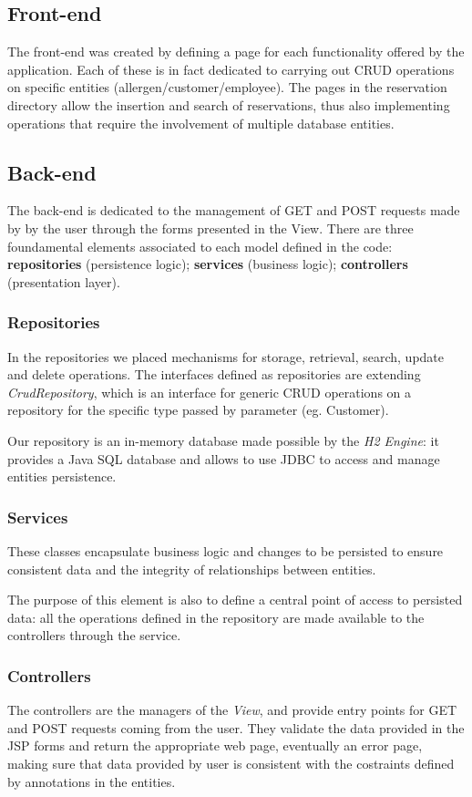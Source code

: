 \documentclass{article}
\begin{document}
\begin{multicols}{2}
\subsection*{Front-end}
The front-end was created by defining a page for each functionality offered by the application. Each of these is in fact dedicated to carrying out CRUD operations on specific entities (allergen/customer/employee). The pages in the reservation directory allow the insertion and search of reservations, thus also implementing operations that require the involvement of multiple database entities.

\subsection*{Back-end}
The back-end is dedicated to the management of GET and POST requests made by by the user through the forms presented in the View. There are three foundamental elements associated to each model defined in the code: \textbf{repositories} (persistence logic); \textbf{services} (business logic); \textbf{controllers} (presentation layer).

\subsubsection*{Repositories}
In the repositories we placed mechanisms for storage, retrieval, search, update and delete operations. The interfaces defined as repositories are extending \textit{CrudRepository}, which is an interface for generic CRUD operations on a repository for the specific type passed by parameter (eg. Customer).

Our repository is an in-memory database made possible by the \textit{H2 Engine}: it provides a Java SQL database and allows to use JDBC to access and manage entities persistence.

\subsubsection*{Services}
These classes encapsulate business logic and changes to be persisted to ensure consistent data and the integrity of relationships between entities.

The purpose of this element is also to define a central point of access to persisted data: all the operations defined in the repository are made available to the controllers through the service.

\end{multicols}

\subsubsection*{Controllers}
The controllers are the managers of the \textit{View}, and provide entry points for GET and POST requests coming from the user. They validate the data provided in the JSP forms and return the appropriate web page, eventually an error page, making sure that data provided by user is consistent with the costraints defined by annotations in the entities. 
\end{document}
